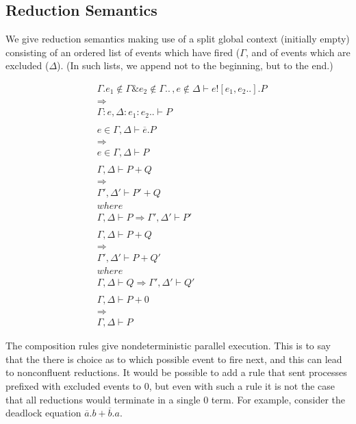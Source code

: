 \documentclass[hoptionsi,review,screen,format=sigconf]{acmart}
\theoremstyle{definition}
\newcommand{\band}{\mathop{\&}}
\begin{document}
\subsection{Reduction Semantics}

We give reduction semantics making use of a split global context (initially empty) consisting of an ordered list of events which have fired (\(\Gamma\), and of events which are excluded (\(\Delta\)). (In such lists, we append not to the beginning, but to the end.)

\begin{align*}
& \Gamma . e_1 \notin \Gamma \band e_2 \notin \Gamma .. \, , e \notin \Delta \vdash e![e_1,e_2..].P
\\ & \Longrightarrow \\
& \Gamma : e, \Delta : e_1:e_2.. \vdash P
\tag{Firing}
\\\\
& e \in \Gamma , \Delta \vdash \overline{e}.P
\\ & \Longrightarrow \\
& e \in \Gamma , \Delta \vdash P
\tag{Waiting}
\\\\
& \Gamma , \Delta \vdash P + Q
\\ & \Longrightarrow \\
& \Gamma ' , \Delta ' \vdash P' + Q
\\ & where
\\ & \Gamma, \Delta  \vdash P \Longrightarrow \Gamma ' , \Delta ' \vdash P'
\tag{Composition-1}
\\\\
& \Gamma , \Delta \vdash P + Q
\\ & \Longrightarrow \\
& \Gamma ' , \Delta ' \vdash P + Q'
\\ & where
\\ & \Gamma, \Delta  \vdash Q \Longrightarrow \Gamma ' , \Delta ' \vdash Q'
\tag{Composition-2}
\\\\
& \Gamma , \Delta \vdash P + 0
\\ & \Longrightarrow \\
& \Gamma , \Delta \vdash P
\tag{Unit}
\end{align*}

The composition rules give nondeterministic parallel execution. This is to say that the there is choice as to which possible event to fire next, and this can lead to nonconfluent reductions. It would be possible to add a rule that sent processes prefixed with excluded events to \(0\), but even with such a rule it is not the case that all reductions would terminate in a single \(0\) term. For example, consider the deadlock equation \(\overline{a}.b + \overline{b}.a\). 
\end{document}
